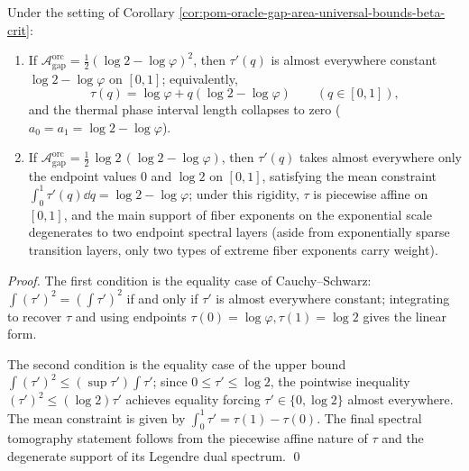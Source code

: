 \begin{theorem}\label{thm:pom-oracle-gap-area-rigidity}
Under the setting of Corollary \ref{cor:pom-oracle-gap-area-universal-bounds-beta-crit}:
\begin{enumerate}
  \item If \(\mathcal{A}^{\mathrm{orc}}_{\mathrm{gap}}=\frac12(\log 2-\log\varphi)^2\), then \(\tau'(q)\) is almost everywhere constant \(\log 2-\log\varphi\) on \([0,1]\);
  equivalently,
  \[
  \tau(q)=\log\varphi+q(\log 2-\log\varphi)\qquad(q\in[0,1]),
  \]
  and the thermal phase interval length collapses to zero (\(a_0=a_1=\log 2-\log\varphi\)).
  \item If \(\mathcal{A}^{\mathrm{orc}}_{\mathrm{gap}}=\frac12\,\log 2\,(\log 2-\log\varphi)\), then \(\tau'(q)\) takes almost everywhere only the endpoint values \(0\) and \(\log 2\) on \([0,1]\), satisfying the mean constraint
  \(
  \int_0^1\tau'(q)\dd q=\log 2-\log\varphi
  \);
  under this rigidity, \(\tau\) is piecewise affine on \([0,1]\), and the main support of fiber exponents on the exponential scale degenerates to two endpoint spectral layers (aside from exponentially sparse transition layers, only two types of extreme fiber exponents carry weight).
\end{enumerate}
\end{theorem}
\begin{proof}
The first condition is the equality case of Cauchy--Schwarz: \(\int(\tau')^2=(\int\tau')^2\) if and only if \(\tau'\) is almost everywhere constant;
integrating to recover \(\tau\) and using endpoints \(\tau(0)=\log\varphi,\tau(1)=\log 2\) gives the linear form.
\par
The second condition is the equality case of the upper bound \(\int(\tau')^2\le (\sup\tau')\int\tau'\);
since \(0\le\tau'\le\log 2\), the pointwise inequality \((\tau')^2\le(\log 2)\tau'\) achieves equality forcing \(\tau'\in\{0,\log 2\}\) almost everywhere.
The mean constraint is given by \(\int_0^1\tau'=\tau(1)-\tau(0)\).
The final spectral tomography statement follows from the piecewise affine nature of \(\tau\) and the degenerate support of its Legendre dual spectrum. \qed
\end{proof}
\endinput


